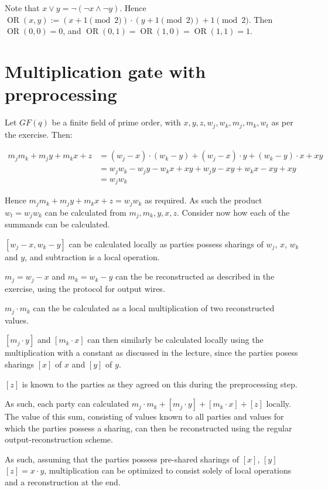 \documentclass[a4paper]{scrreprt}
\begin{document}
Note that $x \lor y = \neg(\neg x \land \neg y)$. Hence $\operatorname{OR}(x,
y) := (x + 1 \pmod{2}) \cdot (y + 1 \pmod{2}) + 1 \pmod{2}$. Then
$\operatorname{OR}(0, 0) = 0$, and $\operatorname{OR}(0, 1) =
\operatorname{OR}(1, 0) = \operatorname{OR}(1, 1) = 1$.

\section{Multiplication gate with preprocessing}

Let $GF(q)$ be a finite field of prime order, with $x, y, z, w_j, w_k, m_j,
m_k, w_t$ as per the exercise. Then:

\begin{align*}
		m_j m_k + m_j y + m_k x + z & = (w_j - x) \cdot (w_k - y) + (w_j - x) \cdot y + (w_k - y) \cdot x + xy \\
									& = w_j w_k - w_j y - w_k x + xy + w_j y - xy + w_k x - xy + xy \\
									& = w_j w_k
\end{align*}

Hence $m_j m_k + m_j y + m_k x + z = w_j w_k$ as required. As such the product
$w_t = w_j w_k$ can be calculated from $m_j, m_k, y, x, z$. Consider now how
each of the summands can be calculated.

\begin{description}
		\item $\left[w_j - x, w_k - y\right]$ can be calculated locally as
				parties possess sharings of $w_j$, $x$, $w_k$ and $y$, and
				subtraction is a local operation.
		\item $m_j = w_j - x$ and $m_k = w_k - y$ can the be reconstructed as
				described in the exercise, using the protocol for output wires.
		\item $m_j \cdot m_k$ can the be calculated as a local multiplication
				of two reconstructed values.
		\item $[m_j \cdot y]$ and $[m_k \cdot x]$ can then similarly be
				calculated locally using the multiplication with a constant as
				discussed in the lecture, since the parties posess sharings
				$[x]$ of $x$ and $[y]$ of $y$.
		\item $[z]$ is known to the parties as they agreed on this during the
				preprocessing step.
\end{description}

As such, each party can calculated $m_j \cdot m_k + [m_j \cdot y] + [m_k \cdot
x] + [z]$ locally. The value of this sum, consisting of values known to all
parties and values for which the parties possess a sharing, can  then be
reconstructed using the regular output-reconstruction scheme.

As such, assuming that the parties possess pre-shared sharings of $[x]$, $[y]$
$[z] = x \cdot y$, multiplication can be optimized to consist solely of local
operations and a reconstruction at the end.
\end{document}
